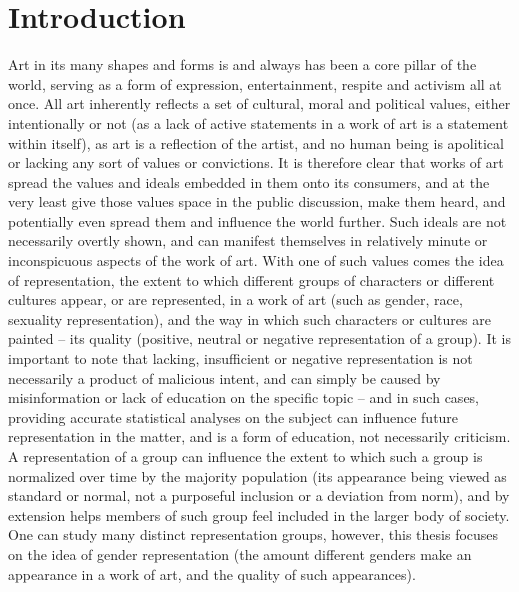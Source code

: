 \documentclass[a4paper, 11pt]{article}
\begin{document}
\section{Introduction}
Art in its many shapes and forms is and always has been a core pillar of the world, serving as a form of expression, entertainment, respite and activism all at once. All art inherently reflects a set of cultural, moral and political values, either intentionally or not (as a lack of active statements in a work of art is a statement within itself), as art is a reflection of the artist, and no human being is apolitical or lacking any sort of values or convictions. It is therefore clear that works of art spread the values and ideals embedded in them onto its consumers, and at the very least give those values space in the public discussion, make them heard, and potentially even spread them and influence the world further. Such ideals are not necessarily overtly shown, and can manifest themselves in relatively minute or inconspicuous aspects of the work of art. With one of such values comes the idea of representation, the extent to which different groups of characters or different cultures appear, or are represented, in a work of art (such as gender, race, sexuality representation), and the way in which such characters or cultures are painted -- its quality (positive, neutral or negative representation of a group). It is important to note that lacking, insufficient or negative representation is not necessarily a product of malicious intent, and can simply be caused by misinformation or lack of education on the specific topic -- and in such cases, providing accurate statistical analyses on the subject can influence future representation in the matter, and is a form of education, not necessarily criticism. A representation of a group can influence the extent to which such a group is normalized over time by the majority population (its appearance being viewed as standard or normal, not a purposeful inclusion or a deviation from norm), and by extension helps members of such group feel included in the larger body of society. One can study many distinct representation groups, however, this thesis focuses on the idea of gender representation (the amount different genders make an appearance in a work of art, and the quality of such appearances).
\end{document}
